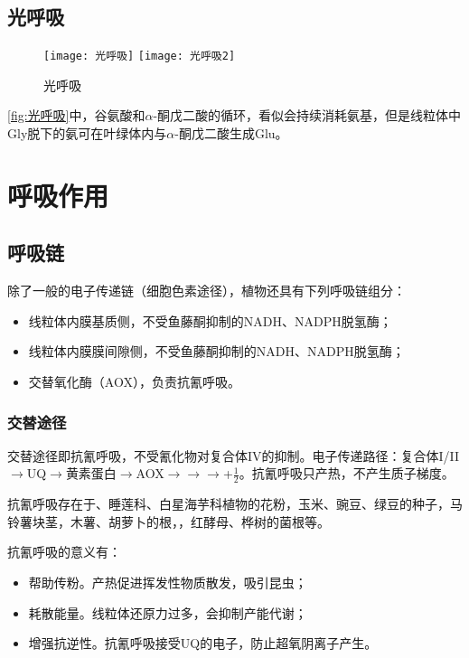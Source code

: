 \subsection{光呼吸}

\begin{figure}[htbp]
	\centering
	\texttt{[image: 光呼吸]}
	\texttt{[image: 光呼吸2]}
	\caption{光呼吸}
	\label{fig:光呼吸}
\end{figure}

\autoref{fig:光呼吸}中，谷氨酸和$\alpha$-酮戊二酸的循环，看似会持续消耗氨基，但是线粒体中Gly脱下的氨可在叶绿体内与$\alpha$-酮戊二酸生成Glu。

\section{呼吸作用}

\subsection{呼吸链}

除了一般的电子传递链（细胞色素途径），植物还具有下列呼吸链组分：

\begin{itemize}
	\item 线粒体内膜基质侧，不受鱼藤酮抑制的NADH、NADPH脱氢酶；
	\item 线粒体内膜膜间隙侧，不受鱼藤酮抑制的NADH、NADPH脱氢酶；
	\item 交替氧化酶（AOX），负责抗氰呼吸。
\end{itemize}

\subsubsection{交替途径}

交替途径即抗氰呼吸，不受氰化物对复合体IV的抑制。电子传递路径：复合体I/II$\longrightarrow$UQ$\longrightarrow$黄素蛋白$\longrightarrow$AOX$\longrightarrow$$\longrightarrow$$\longrightarrow$+$\frac{1}{2}$。抗氰呼吸只产热，不产生质子梯度。

抗氰呼吸存在于、睡莲科、白星海芋科植物的花粉，玉米、豌豆、绿豆的种子，马铃薯块茎，木薯、胡萝卜的根，，红酵母、桦树的菌根等。

抗氰呼吸的意义有：

\begin{itemize}
	\item 帮助传粉。产热促进挥发性物质散发，吸引昆虫；
	\item 耗散能量。线粒体还原力过多，会抑制产能代谢；
	\item 增强抗逆性。抗氰呼吸接受UQ的电子，防止超氧阴离子产生。
\end{itemize}

